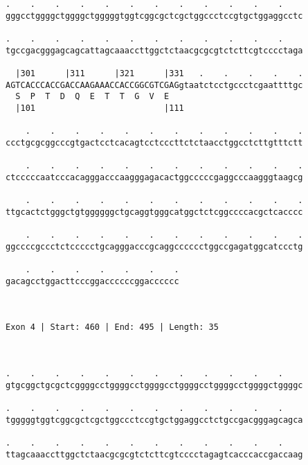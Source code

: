 \documentclass{article}
\begin{document}
\begin{Verbatim}
.    .    .    .    .    .    .    .    .    .    .    .    
gggcctggggctggggctgggggtggtcggcgctcgctggccctccgtgctggaggcctc
                                                            
.    .    .    .    .    .    .    .    .    .    .    .    
tgccgacgggagcagcattagcaaaccttggctctaacgcgcgtctcttcgtcccctaga
                                                            
  |301      |311      |321      |331   .    .    .    .    .
AGTCACCCACCGACCAAGAAACCACCGGCGTCGAGgtaatctcctgccctcgaattttgc
  S  P  T  D  Q  E  T  T  G  V  E                           
  |101                          |111                        
  
    .    .    .    .    .    .    .    .    .    .    .    .
ccctgcgcggcccgtgactcctcacagtcctcccttctctaacctggcctcttgtttctt
                                                            
    .    .    .    .    .    .    .    .    .    .    .    .
ctcccccaatcccacagggacccaagggagacactggcccccgaggcccaagggtaagcg
                                                            
    .    .    .    .    .    .    .    .    .    .    .    .
ttgcactctgggctgtggggggctgcaggtgggcatggctctcggccccacgctcacccc
                                                            
    .    .    .    .    .    .    .    .    .    .    .    .
ggccccgccctctccccctgcagggacccgcaggcccccctggccgagatggcatccctg
                                                            
    .    .    .    .    .    .    .
gacagcctggacttcccggaccccccggacccccc
                                   
                                   
 
Exon 4 | Start: 460 | End: 495 | Length: 35



.    .    .    .    .    .    .    .    .    .    .    .    
gtgcggctgcgctcggggcctggggcctggggcctggggcctggggcctggggctggggc
                                                            
.    .    .    .    .    .    .    .    .    .    .    .    
tgggggtggtcggcgctcgctggccctccgtgctggaggcctctgccgacgggagcagca
                                                            
.    .    .    .    .    .    .    .    .    .    .    .    
ttagcaaaccttggctctaacgcgcgtctcttcgtcccctagagtcacccaccgaccaag
                                                            

\end{Verbatim}
\end{document}
